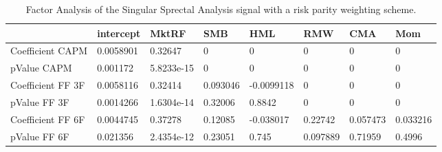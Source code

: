 \begin{table}[H]
\centering
\begin{tabular}{llllllll}
\hline& intercept & MktRF & SMB & HML & RMW & CMA & Mom \\ 
\hline 
Coefficient CAPM & 0.0058901 & 0.32647 & 0 & 0 & 0 & 0 & 0 \\ 
pValue CAPM & 0.001172 & 5.8233e-15 & 0 & 0 & 0 & 0 & 0 \\ 
Coefficient FF 3F & 0.0058116 & 0.32414 & 0.093046 & -0.0099118 & 0 & 0 & 0 \\ 
pValue FF 3F & 0.0014266 & 1.6304e-14 & 0.32006 & 0.8842 & 0 & 0 & 0 \\ 
Coefficient FF 6F & 0.0044745 & 0.37278 & 0.12085 & -0.038017 & 0.22742 & 0.057473 & 0.033216 \\ 
pValue FF 6F & 0.021356 & 2.4354e-12 & 0.23051 & 0.745 & 0.097889 & 0.71959 & 0.4996 \\ 
\hline
\end{tabular}
\caption{Factor Analysis of the Singular Sprectal Analysis signal with a risk parity weighting scheme.}
\label{SSA_RP_FACTOR}
\end{table}
